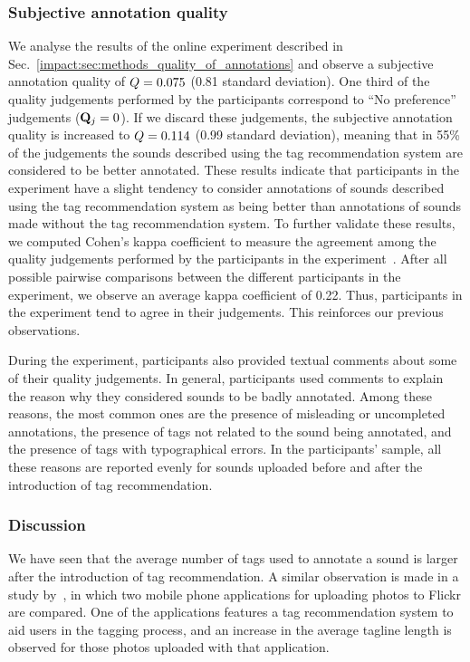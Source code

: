 \subsubsection{Subjective annotation quality} 
We analyse the results of the online experiment described in Sec.~\ref{impact:sec:methods_quality_of_annotations} and observe a subjective annotation quality of $Q=0.075$ (0.81 standard deviation). One third of the quality judgements performed by the participants correspond to ``No preference'' judgements ($\mathbf{Q}_j=0$). If we discard these judgements, the subjective annotation quality is increased to $Q=0.114$ (0.99 standard deviation), meaning that in 55\% of the judgements the sounds described using the tag recommendation system are considered to be better annotated. These results indicate that participants in the experiment have a slight tendency to consider annotations of sounds described using the tag recommendation system as being better than annotations of sounds made without the tag recommendation system.
To further validate these results, we computed Cohen's kappa coefficient to measure the agreement among the quality judgements performed by the participants in the experiment~\citep{carletta1996assessing}. 
After all possible pairwise comparisons between the different participants in the experiment, we observe an average kappa coefficient of 0.22. Thus, participants in the experiment tend to agree in their judgements. This reinforces our previous observations.

During the experiment, participants also provided textual comments about some of their quality judgements. In general, participants used comments to explain the reason why they considered sounds to be badly annotated. Among these reasons, the most common ones are the presence of misleading or uncompleted annotations, the presence of tags not related to the sound being annotated, and the presence of tags with typographical errors. In the participants' sample, all these reasons are reported evenly for sounds uploaded before and after the introduction of tag recommendation.


\subsubsection{Discussion}
We have seen that the average number of tags used to annotate a sound is larger after the introduction of tag recommendation. 
A similar observation is made in a study by~\cite{Ames2007}, in which two mobile phone applications for uploading photos to Flickr are compared. One of the applications features a tag recommendation system to aid users in the tagging process, and an increase in the average tagline length is observed for those photos uploaded with that application.

